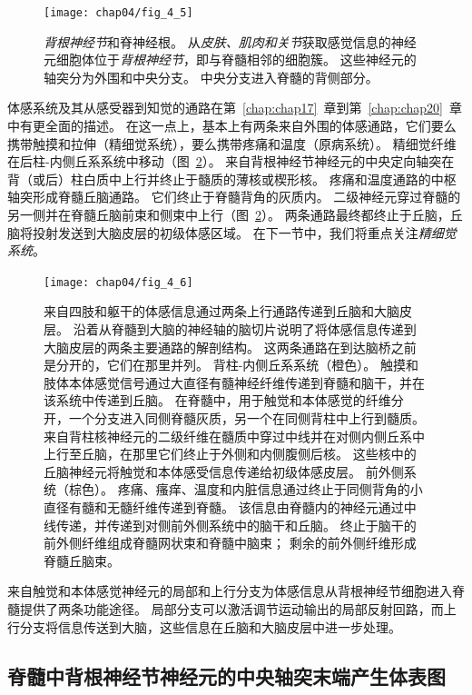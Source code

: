 \begin{figure}[htbp]
	\centering
	\texttt{[image: chap04/fig\_4\_5]}
	\caption{\textit{背根神经节}和脊神经根。
		从\textit{皮肤、肌肉和关节}获取感觉信息的神经元细胞体位于\textit{背根神经节}，即与脊髓相邻的细胞簇。
		这些神经元的轴突分为外围和中央分支。 
		中央分支进入脊髓的背侧部分。}
	\label{fig:4_5}
\end{figure}


体感系统及其从感受器到知觉的通路在第~\ref{chap:chap17}~章到第~\ref{chap:chap20}~章中有更全面的描述。
在这一点上，基本上有两条来自外围的体感通路，它们要么携带触摸和拉伸（精细觉系统），要么携带疼痛和温度（原病系统）。
精细觉纤维在后柱-内侧丘系系统中移动（图~\ref{fig:4_6}）。
来自背根神经节神经元的中央定向轴突在背（或后）柱白质中上行并终止于髓质的薄核或楔形核。
疼痛和温度通路的中枢轴突形成脊髓丘脑通路。
它们终止于脊髓背角的灰质内。
二级神经元穿过脊髓的另一侧并在脊髓丘脑前束和侧束中上行（图~\ref{fig:4_6}）。 
两条通路最终都终止于丘脑，丘脑将投射发送到大脑皮层的初级体感区域。
在下一节中，我们将重点关注\textit{精细觉系统}。


\begin{figure}[htbp]
	\centering
	\texttt{[image: chap04/fig\_4\_6]}
	\caption{来自四肢和躯干的体感信息通过两条上行通路传递到丘脑和大脑皮层。
		沿着从脊髓到大脑的神经轴的脑切片说明了将体感信息传递到大脑皮层的两条主要通路的解剖结构。
		这两条通路在到达脑桥之前是分开的，它们在那里并列。 背柱-内侧丘系系统（橙色）。
		触摸和肢体本体感觉信号通过大直径有髓神经纤维传递到脊髓和脑干，并在该系统中传递到丘脑。
		在脊髓中，用于触觉和本体感觉的纤维分开，一个分支进入同侧脊髓灰质，另一个在同侧背柱中上行到髓质。 
		来自背柱核神经元的二级纤维在髓质中穿过中线并在对侧内侧丘系中上行至丘脑，在那里它们终止于外侧和内侧腹侧后核。
		这些核中的丘脑神经元将触觉和本体感受信息传递给初级体感皮层。
		前外侧系统（棕色）。
		疼痛、瘙痒、温度和内脏信息通过终止于同侧背角的小直径有髓和无髓纤维传递到脊髓。
		该信息由脊髓内的神经元通过中线传递，并传递到对侧前外侧系统中的脑干和丘脑。
		终止于脑干的前外侧纤维组成脊髓网状束和脊髓中脑束； 剩余的前外侧纤维形成脊髓丘脑束。}
	\label{fig:4_6}
\end{figure}


来自触觉和本体感觉神经元的局部和上行分支为体感信息从背根神经节细胞进入脊髓提供了两条功能途径。 
局部分支可以激活调节运动输出的局部反射回路，而上行分支将信息传送到大脑，这些信息在丘脑和大脑皮层中进一步处理。



\subsection{脊髓中背根神经节神经元的中央轴突末端产生体表图}

